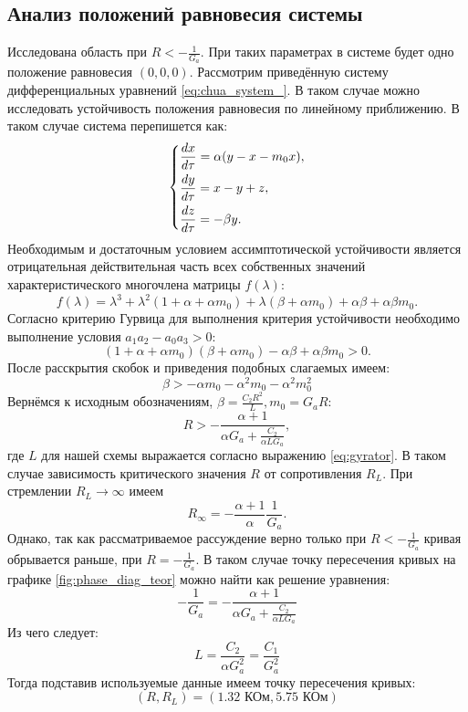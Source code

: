 \documentclass[12pt]{article}
\begin{document}
\subsection*{Анализ положений равновесия системы}
Исследована область при $R < -\frac{1}{G_a}$. При таких параметрах в системе будет одно положение равновесия $(0, 0, 0)$.
Рассмотрим приведённую систему дифференциальных уравнений \ref{eq:chua_system_}. В таком случае можно исследовать устойчивость положения
равновесия по линейному приближению. В таком случае система перепишется как:
\[
	\begin{dcases}
		\frac{dx}{d \tau} = \alpha(y - x - m_0 x), \\
		\frac{dy}{d \tau} = x - y + z,             \\
		\frac{dz}{d \tau} = -\beta y.              \\
	\end{dcases}
\]
Необходимым и достаточным условием ассимптотической устойчивости является отрицательная действительная часть всех собственных значений
характеристического многочлена матрицы $f(\lambda)$:
\[
	f(\lambda) = \lambda^3 + \lambda^2 (1 + \alpha + \alpha m_0) + \lambda (\beta + \alpha m_0) + \alpha \beta + \alpha \beta m_0.
\]
Согласно критерию Гурвица для выполнения критерия устойчивости необходимо выполнение условия $a_1 a_2 - a_0 a_3 > 0$:
\[
	(1 + \alpha + \alpha m_0) (\beta + \alpha m_0) - \alpha \beta + \alpha \beta m_0 > 0.
\]
После расскрытия скобок и приведения подобных слагаемых имеем:
\[
	\beta > -\alpha m_0 - \alpha^2 m_0 - \alpha^2 m_0^2
\]
Вернёмся к исходным обозначениям, $\beta = \frac{C_2 R^2}{L}, m_0 = G_a R$:
\begin{equation}
	R > -\frac{\alpha + 1}{\alpha G_a + \frac{C_2}{\alpha L G_a}},
	\label{eq:R_crit}
\end{equation}
где $L$ для нашей схемы выражается согласно выражению \ref{eq:gyrator}. В таком случае зависимость
критического значения $R$ от сопротивления $R_L$. При стремлении $R_L \to \infty$ имеем
\[
	R_\infty = -\frac{\alpha + 1}{\alpha} \frac{1}{G_a}.
\]
Однако, так как рассматриваемое рассуждение верно только при $R < -\frac{1}{G_a}$ кривая обрывается раньше, при
$R = -\frac{1}{G_a}$. В таком случае точку пересечения кривых на графике \ref{fig:phase_diag_teor} можно найти
как решение уравнения:
\[
	-\frac{1}{G_a} = -\frac{\alpha + 1}{\alpha G_a + \frac{C_2}{\alpha L G_a}}
\]
Из чего следует:
\[
	L = \frac{C_2}{\alpha G_a^2} = \frac{C_1}{G_a^2}
\]
Тогда подставив используемые данные имеем точку пересечения кривых:
\[
	(R, R_L) = (1.32 \text{ КОм}, 5.75 \text{ КОм})
\]
\end{document}
